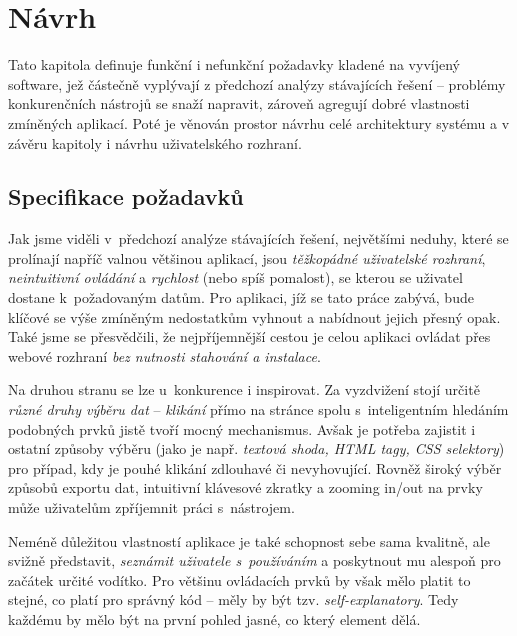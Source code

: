 \documentclass[thesis=B,czech]{FITthesis}[2012/06/26]
\begin{document}

\chapter{Návrh}
Tato kapitola definuje funkční i nefunkční požadavky kladené na vyvíjený software, jež částečně vyplývají z předchozí analýzy stávajících řešení -- problémy konkurenčních nástrojů se snaží napravit, zároveň agregují dobré vlastnosti zmíněných aplikací. Poté je věnován prostor návrhu celé architektury systému a v závěru kapitoly i návrhu uživatelského rozhraní.


\section{Specifikace požadavků}
Jak jsme viděli v~předchozí analýze stávajících řešení, největšími neduhy, které se prolínají napříč valnou většinou aplikací, jsou \emph{těžkopádné uživatelské rozhraní}, \emph{neintuitivní ovládání} a \emph{rychlost} (nebo spíš pomalost), se kterou se uživatel dostane k~požadovaným datům. Pro aplikaci, jíž se tato práce zabývá, bude klíčové se výše zmíněným nedostatkům vyhnout a nabídnout jejich přesný opak. Také jsme se přesvědčili, že nejpříjemnější cestou je celou aplikaci ovládat přes webové rozhraní  \emph{bez nutnosti stahování a instalace}.

Na druhou stranu se lze u~konkurence i inspirovat. Za vyzdvižení stojí určitě \emph{různé druhy výběru dat} -- \emph{klikání} přímo na stránce spolu s~inteligentním hledáním podobných prvků jistě tvoří mocný mechanismus. Avšak je potřeba zajistit i ostatní způsoby výběru (jako je např. \emph{textová shoda, HTML tagy, CSS selektory}) pro případ, kdy je pouhé klikání zdlouhavé či nevyhovující. Rovněž široký výběr způsobů exportu dat, intuitivní klávesové zkratky a zooming in/out na prvky může uživatelům zpříjemnit práci s~nástrojem.

Neméně důležitou vlastností aplikace je také schopnost sebe sama kvalitně, ale svižně představit, \emph{seznámit uživatele s~používáním} a poskytnout mu alespoň pro začátek určité vodítko. Pro většinu ovládacích prvků by však mělo platit to stejné, co platí pro správný kód -- měly by být tzv. \emph{self-explanatory}. Tedy každému by mělo být na první pohled jasné, co který element dělá.
\end{document}
